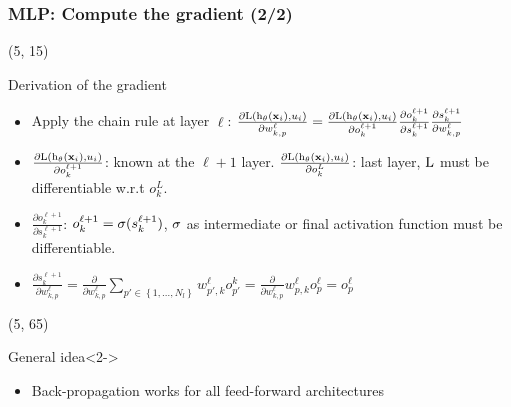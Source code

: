 \begin{frame}
  \frametitle{\acl{MLP}: Compute the gradient (2/2)}

  \begin{textblock}{90}(5, 15)
    \begin{block}{Derivation of the gradient}
      \begin{itemize}
      \item Apply the chain rule at layer $\ell$:
        $
        \frac{\partial \mathrm{L} \left ( {\mathrm{h}_{\mathbf{\theta}} \left ( {\mathbf{x}_i} \right ), u_i} \right ) }{\partial w_{k,p}^\ell} =
        \frac{\partial \mathrm{L} \left ( {\mathrm{h}_{\mathbf{\theta}} \left ( {\mathbf{x}_i} \right ), u_i} \right )}{\partial o_k^{\ell+1}} \frac{\partial o_k^{\ell+1}}{\partial s_k^{\ell+1}} \frac{\partial s_k^{\ell+1}}{\partial w_{k,p}^{\ell}}
        $

      \item $\frac{\partial \mathrm{L} \left ( {\mathrm{h}_{\mathbf{\theta}} \left ( {\mathbf{x}_i} \right ), u_i} \right )}{\partial o_k^{\ell+1}}$: known at the $\ell+1$ layer. $\frac{\partial \mathrm{L} \left ( {\mathrm{h}_{\mathbf{\theta}} \left ( {\mathbf{x}_i} \right ), u_i} \right )}{\partial o_k^{L}}$: last layer, $\mathrm{L}$ must be differentiable w.r.t $o_k^{L}$.


      \item $\frac{\partial o_k^{\ell+1}}{\partial s_k^{\ell+1}}$: $o_k^{\ell+1} = \mathrm{\sigma}(s_k^{\ell+1})$, $\mathrm{\sigma}$ as intermediate or final activation function must be differentiable.

      \item $\frac{\partial s_k^{\ell+1}}{\partial w_{k,p}^{\ell}} = \frac{\partial}{\partial w_{k,p}^{\ell}} \sum_{p' \in \left\{1,\ldots,N_l \right\}}  w_{p', k}^{\ell}o_{p'}^{k}= \frac{\partial }{\partial w_{k,p}^{\ell}}  w_{p, k}^{\ell}o_{p}^{\ell}=o_{p}^{\ell}$

    \end{itemize}
    \end{block}
  \end{textblock}

  \begin{textblock}{90}(5, 65)
    \begin{block}{General idea}<2->
      \begin{itemize}
      \item Back-propagation works for all feed-forward architectures
      \end{itemize}
    \end{block}
  \end{textblock}
\end{frame}


